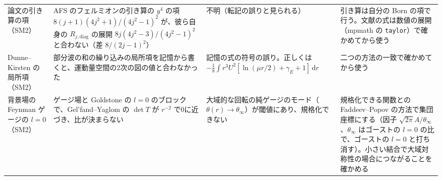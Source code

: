 \documentclass[a4paper,10pt]{ltjsarticle}
\begin{document}
\begin{table}[tbp]
\begin{tabularx}{\linewidth}{>{\raggedright\arraybackslash}p{2.4cm}>{\raggedright\arraybackslash}X>{\raggedright\arraybackslash}X>{\raggedright\arraybackslash}X}
論文の引き算の項（SM2） & AFS のフェルミオンの引き算の $y^4$ の項 $8(j+1)(4j^2+1)/(4j^2-1)^2$ が、彼ら自身の $R_{j,\mathrm{diag}}$ の展開 $8j(4j^2-3)/(4j^2-1)^2$ と合わない（差 $8/(2j-1)^2$） & 不明（転記の誤りと見られる） & 引き算は自分の Born の項で行う。文献の式は数値の展開（mpmath の \texttt{taylor}）で確かめてから使う \\
Dunne--Kirsten の局所項（SM2） & 部分波の和の繰り込みの局所項を記憶から書くと、運動量空間の2次の図の値と合わなかった & 記憶の式の符号の誤り。正しくは $-\frac18\int r^3U^2[\ln(\mu r/2)+\gamma_E+1]\,\mathrm{d}r$ & 二つの方法の一致で確かめてから使う \\
背景場の Feynman ゲージの $l=0$（SM2） & ゲージ場と Goldstone の $l=0$ のブロックで、Gel'fand--Yaglom の $\det T$ が $r^{-2}$ で0に近づき、比が決まらない & 大域的な回転の純ゲージのモード（$\theta(r)\to\theta_\infty$）が閾値にあり、規格化できない & 規格化できる関数との Faddeev--Popov の方法で集団座標にする（因子 $\sqrt{2\pi}A/\theta_\infty$、$\theta_\infty$ はゴーストの $l=0$ の比で、ゴーストの $l=0$ と打ち消す）。小さい結合で大域対称性の場合につながることを確かめる \\
\bottomrule
\end{tabularx}
\end{table}
\end{document}
